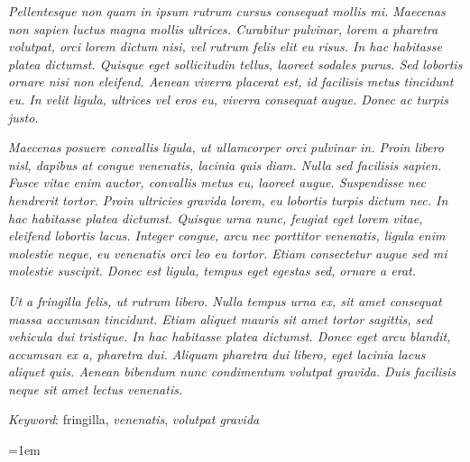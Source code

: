 \documentclass{pkl}
\begin{document}
{\abstracteng

  \emph{Pellentesque non quam in ipsum rutrum cursus consequat mollis
    mi. Maecenas non sapien luctus magna mollis ultrices. Curabitur
    pulvinar, lorem a pharetra volutpat, orci lorem dictum nisi, vel
    rutrum felis elit eu risus. In hac habitasse platea
    dictumst. Quisque eget sollicitudin tellus, laoreet sodales
    purus. Sed lobortis ornare nisi non eleifend. Aenean viverra
    placerat est, id facilisis metus tincidunt eu. In velit ligula,
    ultrices vel eros eu, viverra consequat augue. Donec ac turpis
    justo.}

  \emph{Maecenas posuere convallis ligula, ut ullamcorper orci pulvinar
    in. Proin libero nisl, dapibus at congue venenatis, lacinia quis
    diam. Nulla sed facilisis sapien. Fusce vitae enim auctor, convallis
    metus eu, laoreet augue. Suspendisse nec hendrerit tortor. Proin
    ultricies gravida lorem, eu lobortis turpis dictum nec. In hac
    habitasse platea dictumst. Quisque urna nunc, feugiat eget lorem
    vitae, eleifend lobortis lacus. Integer congue, arcu nec porttitor
    venenatis, ligula enim molestie neque, eu venenatis orci leo eu
    tortor. Etiam consectetur augue sed mi molestie suscipit. Donec est
    ligula, tempus eget egestas sed, ornare a erat.}

  \emph{Ut a fringilla felis, ut rutrum libero. Nulla tempus urna ex, sit
    amet consequat massa accumsan tincidunt. Etiam aliquet mauris sit
    amet tortor sagittis, sed vehicula dui tristique. In hac habitasse
    platea dictumst. Donec eget arcu blandit, accumsan ex a, pharetra
    dui. Aliquam pharetra dui libero, eget lacinia lacus aliquet
    quis. Aenean bibendum nunc condimentum volutpat gravida. Duis
    facilisis neque sit amet lectus venenatis.}

  \emph{Keyword}: fringilla, \emph{venenatis}, \emph{volutpat gravida}
}

\tableofcontents
{}
\listoftables
{}
\listoffigures
{}
{}

\clearpage{}\setcounter{page}{1}




% 
% 
% 

\emergencystretch=1em
\printbibliography[title={DAFTAR PUSTAKA}]

% 
\end{document}
